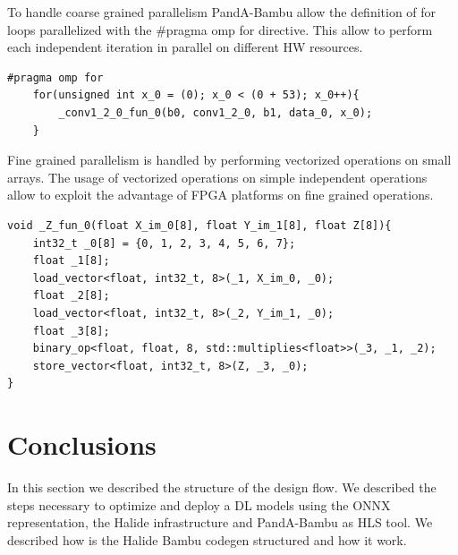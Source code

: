 \documentclass[../main.tex]{subfiles}
\begin{document}
To handle coarse grained parallelism PandA-Bambu allow the definition of for loops parallelized with the \#pragma omp for directive. This allow to perform each independent iteration in parallel on different HW resources.

\bigskip
\begin{lstlisting}[caption = Example of coarse grained parallelism exploited by parallelizing independent iterations. The final model will perform each iteration of the for loop on different resources.]
    #pragma omp for
    for(unsigned int x_0 = (0); x_0 < (0 + 53); x_0++){
        _conv1_2_0_fun_0(b0, conv1_2_0, b1, data_0, x_0);
    }
\end{lstlisting}

\bigskip
Fine grained parallelism is handled by performing vectorized operations on small arrays. The usage of vectorized operations on simple independent operations allow to exploit the advantage of FPGA platforms on fine grained operations.

\bigskip
\begin{lstlisting}[caption = Example of vector multiplication exploiting vectorized operations. In this example the multiply operation is performed on small arrays representing vectors of 8 elements.]
void _Z_fun_0(float X_im_0[8], float Y_im_1[8], float Z[8]){
    int32_t _0[8] = {0, 1, 2, 3, 4, 5, 6, 7};
    float _1[8];
    load_vector<float, int32_t, 8>(_1, X_im_0, _0);
    float _2[8];
    load_vector<float, int32_t, 8>(_2, Y_im_1, _0);
    float _3[8];
    binary_op<float, float, 8, std::multiplies<float>>(_3, _1, _2);
    store_vector<float, int32_t, 8>(Z, _3, _0);
}
\end{lstlisting}

\newpage
\section{Conclusions}
In this section we described the structure of the design flow. We described the steps necessary to optimize and deploy a DL models using the ONNX representation, the Halide infrastructure and PandA-Bambu as HLS tool. We described how is the Halide Bambu codegen structured and how it work.
\end{document}

